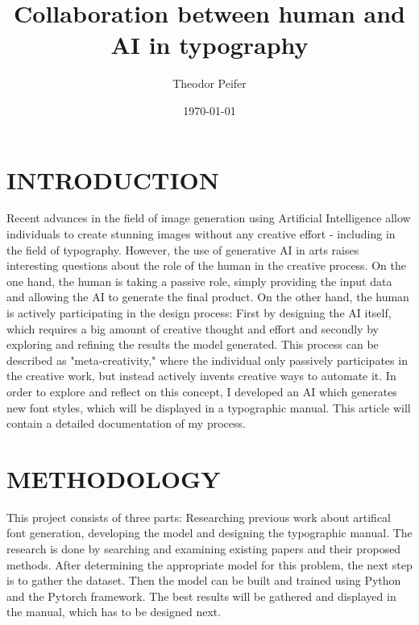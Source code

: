 \documentclass[11pt]{article}
\title{Collaboration between human and AI in typography}
\author{Theodor Peifer}
\date{\today}
\begin{document}
\maketitle	
\pagebreak

\section{INTRODUCTION}
Recent advances in the field of image generation using Artificial Intelligence allow individuals to create stunning images without any creative effort - including in the field of typography.
However, the use of generative AI in arts raises interesting questions about the role of the human in the creative process. On the one hand, the human is taking a passive role, simply providing the input data and allowing the AI to generate the final product. On the other hand, the human is actively participating in the design process: First by designing the AI itself, which requires a big amount of creative thought and effort and secondly by exploring and refining the results the model generated.
This process can be described as "meta-creativity," where the individual only passively participates in the creative work, but instead actively invents creative ways to automate it.
In order to explore and reflect on this concept, I developed an AI which generates new font styles, which will be displayed in a typographic manual. This article will contain a detailed documentation of my process.


\section{METHODOLOGY}
This project consists of three parts: Researching previous work about artifical font generation, developing the model and designing the typographic manual.
The research is done by searching and examining existing papers and their proposed methods. After determining the appropriate model for this problem, the next step is to gather the dataset. Then the model can be built and trained using Python and the Pytorch framework. The best results will be gathered and displayed in the manual, which has to be designed next.
\end{document}
